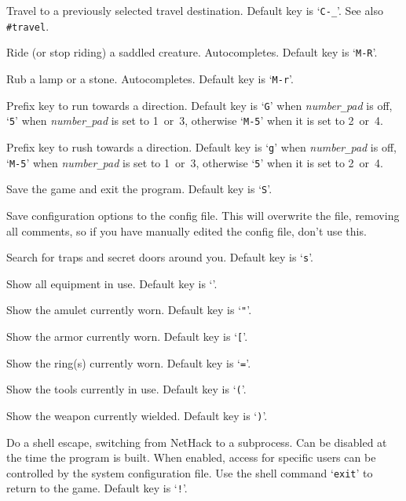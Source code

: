 Travel to a previously selected travel destination.
Default key is `{\tt C-\verb+_+}'.
See also {\tt \#travel}.
\item[\tb{\#ride}]
Ride (or stop riding) a saddled creature. Autocompletes.
Default key is `{\tt M-R}'.
\item[\tb{\#rub}]
Rub a lamp or a stone. Autocompletes. Default key is `{\tt M-r}'.
\item[\tb{\#run}]
Prefix key to run towards a direction.
Default key is `{\tt G}' when
{\it number\verb+_+pad\/}
is off,
`{\tt 5}' when
{\it number\verb+_+pad\/}
is set to 1~or~3,
otherwise `{\tt M-5}' when it is set to 2~or~4.
\item[\tb{\#rush}]
Prefix key to rush towards a direction.
Default key is `{\tt g}' when
{\it number\verb+_+pad\/}
is off,
`{\tt M-5}' when
{\it number\verb+_+pad\/}
is set to 1~or~3,
otherwise `{\tt 5}' when it is set to 2~or~4.
\item[\tb{\#save}]
Save the game and exit the program.
Default key is `{\tt S}'.
\item[\tb{\#saveoptions}]
Save configuration options to the config file.
This will overwrite the file, removing all comments, so if you have
manually edited the config file, don't use this.
\item[\tb{\#search}]
Search for traps and secret doors around you. Default key is `{\tt s}'.
\item[\tb{\#seeall}]
Show all equipment in use. Default key is `{\tt *}'.
\item[\tb{\#seeamulet}]
Show the amulet currently worn. Default key is `{\tt "}'.
\item[\tb{\#seearmor}]
Show the armor currently worn. Default key is `{\tt [}'.
\item[\tb{\#seerings}]
Show the ring(s) currently worn. Default key is `{\tt =}'.
\item[\tb{\#seetools}]
Show the tools currently in use. Default key is `{\tt (}'.
\item[\tb{\#seeweapon}]
Show the weapon currently wielded. Default key is `{\tt )}'.
\item[\tb{\#shell}]
Do a shell escape, switching from NetHack to a subprocess.
Can be disabled at the time the program is built.
When enabled, access for specific users can be controlled by the system
configuration file.
Use the shell command `{\tt exit}' to return to the game.
Default key is `{\tt !}'.
\item[\tb{\#showgold}]
